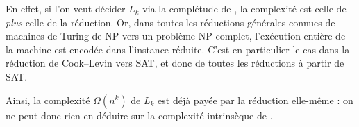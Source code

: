 \begin{exercice}[Appartenance à P/NP]
\begin{corrections}
    En effet, si l'on veut décider $L_k$ via la complétude de \PROBLEM{}, 
    la complexité est celle de \PROBLEM{} \emph{plus} celle de la réduction.
    Or, dans toutes les réductions générales connues de machines de Turing de NP 
    vers un problème NP-complet, l'exécution entière de la machine est encodée dans l'instance réduite.
    C'est en particulier le cas dans la réduction de Cook–Levin vers \textsc{SAT},
    et donc de toutes les réductions à partir de \textsc{SAT}.

    Ainsi, la complexité $\Omega(n^k)$ de $L_k$ est déjà payée par la réduction elle-même :
    on ne peut donc rien en déduire sur la complexité intrinsèque de \PROBLEM.
  \end{corrections}
  
\end{exercice}

\endgroup
\endinput
